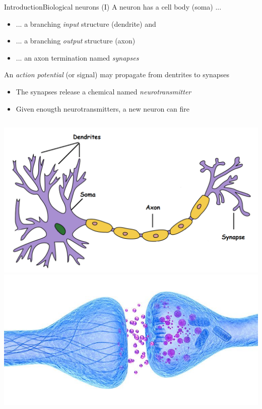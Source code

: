 \documentclass[10pt,compress]{beamer} %
\begin{document}
\begin{frame}{Introduction}{Biological neurons (I)}
	A neuron has a cell body (soma) ...
		\begin{itemize}
		\item ... a branching \textit{input} structure (dendrite) and 
		\item ... a branching \textit{output} structure (axon)
		\item ... an axon termination named \textit{synapses}
		\end{itemize}
	An \textit{action potential} (or signal) may propagate from dentrites to synapses
		\begin{itemize}
		\item The synapses release a chemical named \textit{neurotransmitter}
		\item Given enougth neurotransmitters, a new neuron can fire
		\end{itemize}

	\medskip

	\begin{columns}[c]
			\includegraphics[width=\linewidth]{figs/neuron-bio.png}
			\includegraphics[width=\linewidth]{figs/sinapsis.jpg}
    \end{columns}
\end{frame}
\end{document}
